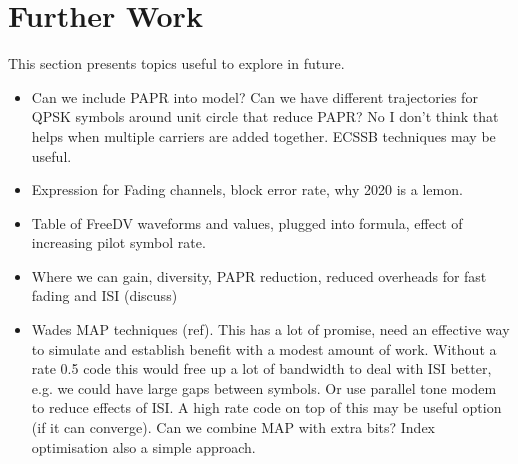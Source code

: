 \documentclass{article}
\begin{document}
\section{Further Work}

This section presents topics useful to explore in future.

\begin{itemize}
\item Can we include PAPR into model? Can we have different trajectories for QPSK symbols around unit circle that reduce PAPR?  No I don't think that helps when multiple carriers are added together.  ECSSB techniques may be useful.
\item Expression for Fading channels, block error rate, why 2020 is a lemon.
\item Table of FreeDV waveforms and values, plugged into formula, effect of increasing pilot symbol rate.
\item Where we can gain, diversity, PAPR reduction, reduced overheads for fast fading and ISI (discuss)
\item Wades MAP techniques (ref).  This has a lot of promise, need an effective way to simulate and establish benefit with a modest amount of work.  Without a rate 0.5 code this would free up a lot of bandwidth to deal with ISI better, e.g. we could have large gaps between symbols.  Or use parallel tone modem to reduce effects of ISI.  A high rate code on top of this may be useful option (if it can converge).   Can we combine MAP with extra bits?  Index optimisation also a simple approach.
\end{itemize} 

\nocite{*}


\end{document}
